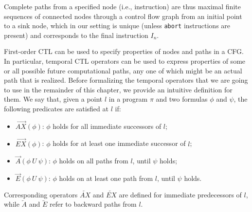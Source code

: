 \noindent Complete paths from a specified node (i.e., instruction) are thus maximal finite sequences of connected nodes through a control flow graph from an initial point to a sink node, which in our setting is unique (unless {\tt abort} instructions are present) and corresponds to the final instruction $I_n$.

First-order CTL can be used to specify properties of nodes and paths in a CFG. In particular, temporal CTL operators can be used to express properties of some or all possible future computational paths, any one of which might be an actual path that is realized. Before formalizing the temporal operators that we are going to use in the remainder of this chapter, we provide an intuitive definition for them. We say that, given a point $l$ in a program $\pi$ and two formulas $\phi$ and $\psi$, the following predicates are satisfied at $l$ if:

\begin{itemize}[parsep=0pt,topsep=3pt]
\item $\overrightarrow{AX}(\phi)$: $\phi$ holds for all immediate successors of $l$;
\item $\overrightarrow{EX}(\phi)$: $\phi$ holds for at least one immediate successor of $l$;
\item $\overrightarrow{A}(\phi~U~\psi)$: $\phi$ holds on all paths from $l$, until $\psi$ holds;
\item $\overrightarrow{E}(\phi~U~\psi)$: $\phi$ holds on at least one path from $l$, until $\psi$ holds.
\end{itemize}
\noindent Corresponding operators $\overleftarrow{AX}$ and $\overleftarrow{EX}$ are defined for immediate predecessors of $l$, while $\overleftarrow{A}$ and $\overleftarrow{E}$ refer to backward paths from $l$.


